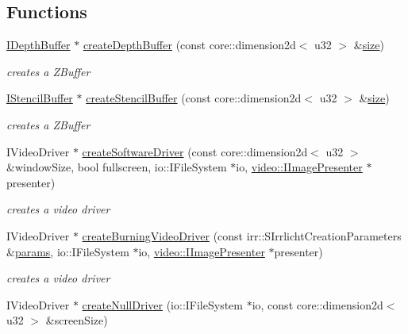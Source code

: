 \subsection*{Functions}
\begin{DoxyCompactItemize}
\item 
\hyperlink{classirr_1_1video_1_1_i_depth_buffer}{I\-Depth\-Buffer} $\ast$ \hyperlink{namespaceirr_1_1video_a3a930ab5dae841f5acde4eb773bdd2d1}{create\-Depth\-Buffer} (const core\-::dimension2d$<$ u32 $>$ \&\hyperlink{glext_8h_a3d1e3edfcf61ca2d831883e1afbad89e}{size})
\begin{DoxyCompactList}\small\item\em creates a Z\-Buffer \end{DoxyCompactList}\item 
\hyperlink{classirr_1_1video_1_1_i_stencil_buffer}{I\-Stencil\-Buffer} $\ast$ \hyperlink{namespaceirr_1_1video_a2fc2af4ffad229fc5610d02af0ab747d}{create\-Stencil\-Buffer} (const core\-::dimension2d$<$ u32 $>$ \&\hyperlink{glext_8h_a3d1e3edfcf61ca2d831883e1afbad89e}{size})
\begin{DoxyCompactList}\small\item\em creates a Z\-Buffer \end{DoxyCompactList}\item 
I\-Video\-Driver $\ast$ \hyperlink{namespaceirr_1_1video_a49663aaca888d2d9c9c2199e3b79bcf0}{create\-Software\-Driver} (const core\-::dimension2d$<$ u32 $>$ \&window\-Size, bool fullscreen, io\-::\-I\-File\-System $\ast$io, \hyperlink{classirr_1_1video_1_1_i_image_presenter}{video\-::\-I\-Image\-Presenter} $\ast$presenter)
\begin{DoxyCompactList}\small\item\em creates a video driver \end{DoxyCompactList}\item 
I\-Video\-Driver $\ast$ \hyperlink{namespaceirr_1_1video_a9992df6286f8f8ef3ec3e891b985ef45}{create\-Burning\-Video\-Driver} (const irr\-::\-S\-Irrlicht\-Creation\-Parameters \&\hyperlink{glext_8h_a7eca977aec48ecd8d48ebd7558c0538c}{params}, io\-::\-I\-File\-System $\ast$io, \hyperlink{classirr_1_1video_1_1_i_image_presenter}{video\-::\-I\-Image\-Presenter} $\ast$presenter)
\begin{DoxyCompactList}\small\item\em creates a video driver \end{DoxyCompactList}\item 
I\-Video\-Driver $\ast$ \hyperlink{namespaceirr_1_1video_a77ba3d610208ef2c5f976839510fdffc}{create\-Null\-Driver} (io\-::\-I\-File\-System $\ast$io, const core\-::dimension2d$<$ u32 $>$ \&screen\-Size)

\end{DoxyCompactItemize}
